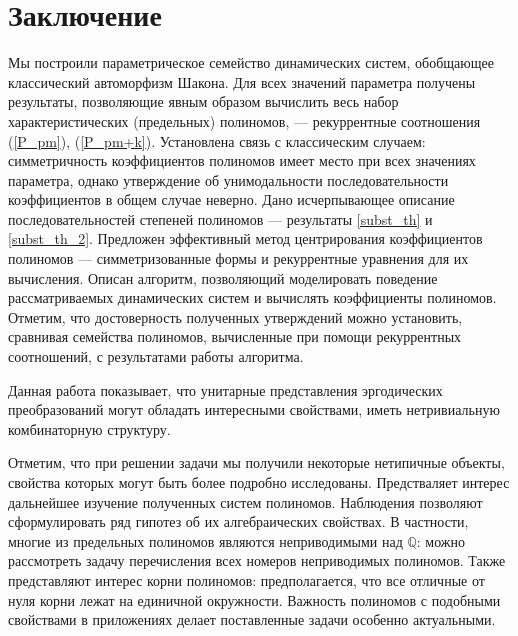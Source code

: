 \documentclass[14pt, a4paper, russian]{report}
\begin{document}
\chapter*{Заключение}
Мы построили параметрическое семейство динамических систем, обобщающее классический автоморфизм Шакона. Для всех значений параметра получены результаты, позволяющие явным образом вычислить весь набор характеристических (предельных) полиномов, --- рекуррентные соотношения (\ref{P_pm}), (\ref{P_pm+k}). Установлена связь с классическим случаем: симметричность коэффициентов полиномов имеет место при всех значениях параметра, однако утверждение об унимодальности последовательности коэффициентов в общем случае неверно. Дано исчерпывающее описание последовательностей степеней полиномов --- результаты \cref{subst_th} и \cref{subst_th_2}. Предложен эффективный метод центрирования коэффициентов полиномов --- симметризованные формы и рекуррентные уравнения для их вычисления. Описан алгоритм, позволяющий моделировать поведение рассматриваемых динамических систем и вычислять коэффициенты полиномов. Отметим, что достоверность полученных утверждений можно установить, сравнивая семейства полиномов, вычисленные при помощи рекуррентных соотношений, с результатами работы алгоритма.

Данная работа показывает, что унитарные представления эргодических преобразований могут обладать интересными свойствами, иметь нетривиальную комбинаторную структуру.

Отметим, что при решении задачи мы получили некоторые нетипичные объекты, свойства которых могут быть более подробно исследованы. Предстваляет интерес дальнейшее изучение полученных систем полиномов. Наблюдения позволяют сформулировать ряд гипотез об их алгебраических свойствах. В частности, многие из предельных полиномов являются неприводимыми над $\mathbb{Q}$: можно рассмотреть задачу перечисления всех номеров неприводимых полиномов. Также представляют интерес корни полиномов: предполагается, что все отличные от нуля корни лежат на единичной окружности. Важность полиномов с подобными свойствами в приложениях делает поставленные задачи особенно актуальными.

\newpage

\end{document}

